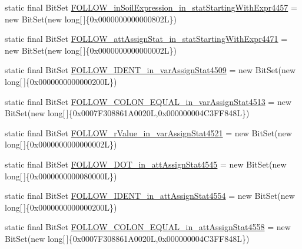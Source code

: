 \begin{DoxyCompactItemize}
\item 
static final Bit\-Set \hyperlink{classorg_1_1tzi_1_1use_1_1parser_1_1shell_1_1_shell_command_parser_a05ff34c1e9784a9a1e9525efb4d54657}{F\-O\-L\-L\-O\-W\-\_\-in\-Soil\-Expression\-\_\-in\-\_\-stat\-Starting\-With\-Expr4457} = new Bit\-Set(new long\mbox{[}$\,$\mbox{]}\{0x0000000000000802\-L\})
\item 
static final Bit\-Set \hyperlink{classorg_1_1tzi_1_1use_1_1parser_1_1shell_1_1_shell_command_parser_a0145f522c484cb7d933136027570a262}{F\-O\-L\-L\-O\-W\-\_\-att\-Assign\-Stat\-\_\-in\-\_\-stat\-Starting\-With\-Expr4471} = new Bit\-Set(new long\mbox{[}$\,$\mbox{]}\{0x0000000000000002\-L\})
\item 
static final Bit\-Set \hyperlink{classorg_1_1tzi_1_1use_1_1parser_1_1shell_1_1_shell_command_parser_a7eab4c2726aa04fda89b810d7f2faf6f}{F\-O\-L\-L\-O\-W\-\_\-\-I\-D\-E\-N\-T\-\_\-in\-\_\-var\-Assign\-Stat4509} = new Bit\-Set(new long\mbox{[}$\,$\mbox{]}\{0x0000000000000200\-L\})
\item 
static final Bit\-Set \hyperlink{classorg_1_1tzi_1_1use_1_1parser_1_1shell_1_1_shell_command_parser_a708ded787c9bebf0df5bcaa7e8f8c8fc}{F\-O\-L\-L\-O\-W\-\_\-\-C\-O\-L\-O\-N\-\_\-\-E\-Q\-U\-A\-L\-\_\-in\-\_\-var\-Assign\-Stat4513} = new Bit\-Set(new long\mbox{[}$\,$\mbox{]}\{0x0007\-F308861\-A0020\-L,0x000000004\-C3\-F\-F848\-L\})
\item 
static final Bit\-Set \hyperlink{classorg_1_1tzi_1_1use_1_1parser_1_1shell_1_1_shell_command_parser_a356aeeaa039ed5bbbc2d6a0b61431d25}{F\-O\-L\-L\-O\-W\-\_\-r\-Value\-\_\-in\-\_\-var\-Assign\-Stat4521} = new Bit\-Set(new long\mbox{[}$\,$\mbox{]}\{0x0000000000000002\-L\})
\item 
static final Bit\-Set \hyperlink{classorg_1_1tzi_1_1use_1_1parser_1_1shell_1_1_shell_command_parser_ad8db18980c2cce97321a6b62a84aa0bf}{F\-O\-L\-L\-O\-W\-\_\-\-D\-O\-T\-\_\-in\-\_\-att\-Assign\-Stat4545} = new Bit\-Set(new long\mbox{[}$\,$\mbox{]}\{0x0000000000080000\-L\})
\item 
static final Bit\-Set \hyperlink{classorg_1_1tzi_1_1use_1_1parser_1_1shell_1_1_shell_command_parser_a7dae178955e468a37d6215c772ef8027}{F\-O\-L\-L\-O\-W\-\_\-\-I\-D\-E\-N\-T\-\_\-in\-\_\-att\-Assign\-Stat4554} = new Bit\-Set(new long\mbox{[}$\,$\mbox{]}\{0x0000000000000200\-L\})
\item 
static final Bit\-Set \hyperlink{classorg_1_1tzi_1_1use_1_1parser_1_1shell_1_1_shell_command_parser_a794ff1305cf55e2235906da47e139429}{F\-O\-L\-L\-O\-W\-\_\-\-C\-O\-L\-O\-N\-\_\-\-E\-Q\-U\-A\-L\-\_\-in\-\_\-att\-Assign\-Stat4558} = new Bit\-Set(new long\mbox{[}$\,$\mbox{]}\{0x0007\-F308861\-A0020\-L,0x000000004\-C3\-F\-F848\-L\})

\end{DoxyCompactItemize}
